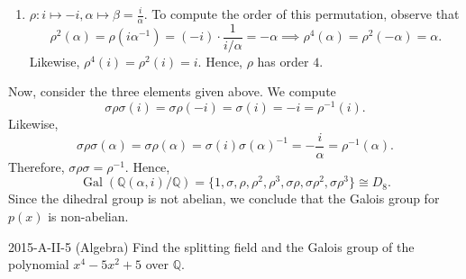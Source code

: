 \documentclass{article}
\begin{document}
\begin{solutions}
\begin{enumerate}[itemsep =-2pt,label = (\alph{*})]
\begin{enumerate}[itemsep =-2pt,label =(\roman{*})]
				\item $\rho: i \mapsto -i, \alpha \mapsto \beta = \frac{i}{\alpha}$. To compute the order of this permutation, observe that 
				\begin{equation}
					\rho^{2}(\alpha) = \rho(i\alpha^{-1}) = (-i) \cdot \frac{1}{i/\alpha} = -\alpha \implies \rho^{4}(\alpha) = \rho^{2}(-\alpha) = \alpha. 
				\end{equation}
				Likewise, $\rho^{4}(i) = \rho^{2}(i) = i$. Hence, $\rho$ has order $4$. 
			\end{enumerate}
			Now, consider the three elements given above. We compute 
			\begin{equation}
				\sigma\rho\sigma(i) = \sigma\rho(-i) = \sigma(i) = -i = \rho^{-1}(i). 
			\end{equation}
			Likewise, 
			\begin{equation}
				\sigma\rho\sigma(\alpha) = \sigma\rho(\alpha) = \sigma(i)\sigma(\alpha)^{-1} = -\frac{i}{\alpha} = \rho^{-1}(\alpha). 
			\end{equation}
			Therefore, $\sigma \rho \sigma = \rho^{-1}$. Hence, 
			\begin{equation}
				\operatorname{Gal}(\mathbb{Q}(\alpha,i)/\mathbb{Q}) = \{1, \sigma, \rho, \rho^{2}, \rho^{3}, \sigma\rho, \sigma\rho^{2},  \sigma\rho^{3}\} \cong D_{8}. 
			\end{equation}
			Since the dihedral group is not abelian, we conclude that the Galois group for $p(x)$ is non-abelian. 
	\end{enumerate}
\end{solutions}
\begin{prb}{2015-A-II-5 (Algebra)}
	Find the splitting field and the Galois group of the polynomial $x^{4} - 5x^{2} + 5$ over $\mathbb{Q}$. 
\end{prb}
\end{document}
